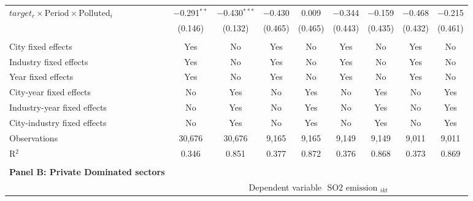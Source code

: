 \documentclass[12pt]{article}
\begin{document}
\begin{table}[!htb]
\begin{adjustbox}{width=\textwidth, totalheight=\baselineskip,keepaspectratio}
\begin{tabular}{@{\extracolsep{5pt}}lcccccccc}
   $target_c \times \text{Period} \times \text{Polluted}_i$  & $-$0.291$^{**}$ & $-$0.430$^{***}$ & $-$0.430 & 0.009 & $-$0.344 & $-$0.159 & $-$0.468 & $-$0.215 \\ 
  & (0.146) & (0.132) & (0.465) & (0.465) & (0.443) & (0.435) & (0.432) & (0.461) \\ 
 \hline \\[-1.8ex] 
City fixed effects & Yes & No & Yes & No & Yes & No & Yes & No \\ 
Industry fixed effects & Yes & No & Yes & No & Yes & No & Yes & No \\ 
Year fixed effects & Yes & No & Yes & No & Yes & No & Yes & No \\ 
City-year fixed effects & No & Yes & No & Yes & No & Yes & No & Yes \\ 
Industry-year fixed effects & No & Yes & No & Yes & No & Yes & No & Yes \\ 
City-industry fixed effects & No & Yes & No & Yes & No & Yes & No & Yes \\ 
Observations & 30,676 & 30,676 & 9,165 & 9,165 & 9,149 & 9,149 & 9,011 & 9,011 \\ 
R$^{2}$ & 0.346 & 0.851 & 0.377 & 0.872 & 0.376 & 0.868 & 0.373 & 0.869 \\ 
        \bottomrule
        \\ %
        \multicolumn{1}{l}{\textbf{Panel B: Private Dominated sectors}} \\
        \toprule
        & \multicolumn{8}{c}{Dependent variable $\text { SO2 emission }_{i k t}$} \\ 
        \cline{2-9}
            

\end{tabular}
\end{adjustbox}
\end{table}
\end{document}
